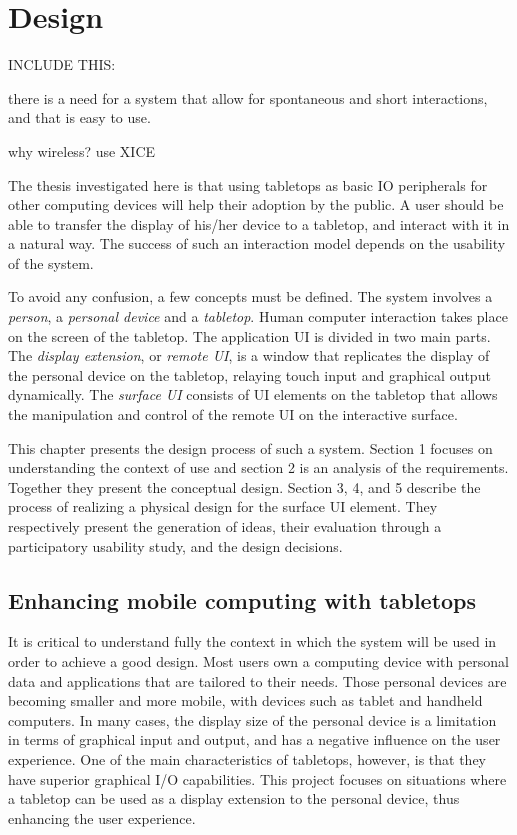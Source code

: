 
\chapter{Design}
\label{design}

INCLUDE THIS:

there is a need for a system that allow for spontaneous and short interactions, and that is easy to use.

why wireless? use XICE
\\
\linebreak

The thesis investigated here is that using tabletops as basic IO peripherals for other computing devices will help their adoption by the public.
A user should be able to transfer the display of his/her device to a tabletop, and interact with it in a natural way.
The success of such an interaction model depends on the usability of the system. 

To avoid any confusion, a few concepts must be defined.
The system involves a \emph{person}, a \emph{personal device} and a \emph{tabletop}.
Human computer interaction takes place on the screen of the tabletop.
The application UI is divided in two main parts.
The \emph{display extension}, or \emph{remote UI}, is a window that replicates the display of the personal device on the tabletop, relaying touch input and graphical output dynamically.
The \emph{surface UI} consists of UI elements on the tabletop that allows the manipulation and control of the remote UI on the interactive surface.

This chapter presents the design process of such a system.
Section 1 focuses on understanding the context of use and section 2 is an analysis of the requirements. Together they present the conceptual design.
Section 3, 4, and 5 describe the process of realizing a physical design for the surface UI element. They respectively present the generation of ideas, their evaluation through a participatory usability study, and the design decisions.

\section{Enhancing mobile computing with tabletops}

It is critical to understand fully the context in which the system will be used in order to achieve a good design.
Most users own a computing device with personal data and applications that are tailored to their needs.
Those personal devices are becoming smaller and more mobile, with devices such as tablet and handheld computers.
In many cases, the display size of the personal device is a limitation in terms of graphical input and output, and has a negative influence on the user experience.
One of the main characteristics of tabletops, however, is that they have superior graphical I/O capabilities.
This project focuses on situations where a tabletop can be used as a display extension to the personal device, thus enhancing the user experience.

